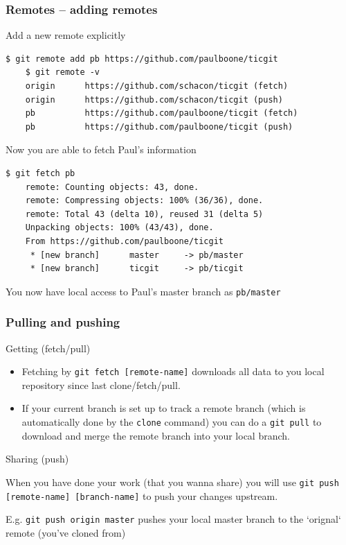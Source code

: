 \documentclass{beamer}
\begin{document}
\begin{frame}[fragile]
  \frametitle{Remotes -- adding remotes}
  Add a new remote explicitly
  \begin{lstlisting}[basicstyle=\ttfamily\tiny]
    $ git remote add pb https://github.com/paulboone/ticgit
    $ git remote -v
    origin      https://github.com/schacon/ticgit (fetch)
    origin      https://github.com/schacon/ticgit (push)
    pb          https://github.com/paulboone/ticgit (fetch)
    pb          https://github.com/paulboone/ticgit (push)
  \end{lstlisting}
  Now you are able to fetch Paul's information
  \begin{lstlisting}[basicstyle=\ttfamily\tiny]
    $ git fetch pb
    remote: Counting objects: 43, done.
    remote: Compressing objects: 100% (36/36), done.
    remote: Total 43 (delta 10), reused 31 (delta 5)
    Unpacking objects: 100% (43/43), done.
    From https://github.com/paulboone/ticgit
     * [new branch]      master     -> pb/master
     * [new branch]      ticgit     -> pb/ticgit
  \end{lstlisting}

  You now have local access to Paul's master branch as \lstinline{pb/master}
\end{frame}

\begin{frame}[fragile]
  \frametitle{Pulling and pushing} 
  Getting (fetch/pull)
  \begin{itemize}
    \item   Fetching by
      \lstinline{git fetch [remote-name]} downloads all data to you local
      repository since last clone/fetch/pull.
    \item   If your current branch is set up to track a remote branch (which is
      automatically done by the \lstinline{clone} command) you can do a
      \lstinline{git pull} to download and merge the remote branch into
      your local branch.
  \end{itemize}

  Sharing (push)
  
  When you have done your work (that you wanna share) you will use
  \lstinline{git push [remote-name] [branch-name]} to push your changes upstream.

  E.g. \lstinline{git push origin master} pushes your local master
  branch to the `orignal` remote (you've cloned from)
\end{frame}
\end{document}
